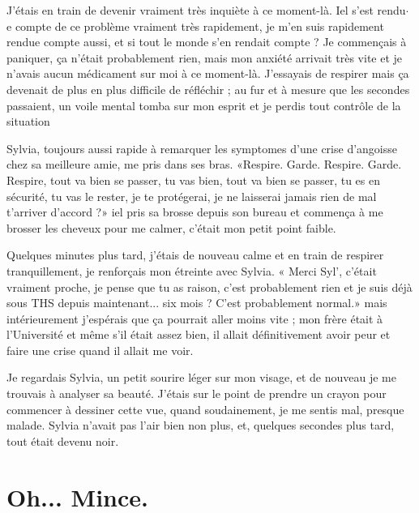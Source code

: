 \documentclass[12pt,hidelinks,a4paper]{book}
\begin{document}
\bigskip

J'étais en train de devenir vraiment très inquiète à ce moment-là.
Iel s'est rendu$\cdot$ e compte de ce problème vraiment très rapidement,
je m'en suis rapidement rendue compte aussi, et si tout le monde s'en
rendait compte ? Je commençais à paniquer, ça n'était probablement
rien, mais mon anxiété arrivait très vite et je n'avais aucun médicament
sur moi à ce moment-là. J'essayais de respirer mais ça devenait de
plus en plus difficile de réfléchir ; au fur et à mesure que les secondes
passaient, un voile mental tomba sur mon esprit et je perdis tout
contrôle de la situation

\bigskip

Sylvia, toujours aussi rapide à remarquer les symptomes d'une crise
d'angoisse chez sa meilleure amie, me pris dans ses bras. «Respire.
Garde. Respire. Garde. Respire, tout va bien se passer, tu vas bien,
tout va bien se passer, tu es en sécurité, tu vas le rester, je te
protégerai, je ne laisserai jamais rien de mal t'arriver d'accord
?» iel pris sa brosse depuis son bureau et commença à me brosser
les cheveux pour me calmer, c'était mon petit point faible.

\bigskip

Quelques minutes plus tard, j'étais de nouveau calme et en train de
respirer tranquillement, je renforçais mon étreinte avec Sylvia. «
Merci Syl', c'était vraiment proche, je pense que tu as raison, c'est
probablement rien et je suis déjà sous THS depuis maintenant... six
mois ? C'est probablement normal.» mais intérieurement j'espérais
que ça pourrait aller moins vite ; mon frère était à l'Université
et même s'il était assez bien, il allait définitivement avoir peur
et faire une crise quand il allait me voir.

\bigskip

Je regardais Sylvia, un petit sourire léger sur mon visage, et de
nouveau je me trouvais à analyser sa beauté. J'étais sur le point
de prendre un crayon pour commencer à dessiner cette vue, quand soudainement,
je me sentis mal, presque malade. Sylvia n'avait pas l'air bien non
plus, et, quelques secondes plus tard, tout était devenu noir.



\chapter{Oh... Mince.}
\end{document}
